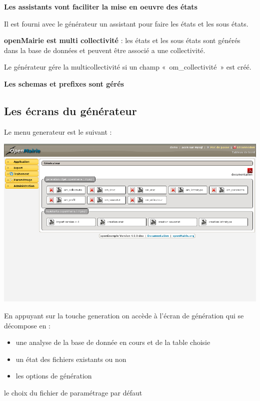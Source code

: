 \documentclass[letterpaper,10pt,french]{manual}
\begin{document}
\textbf{Les assistants vont faciliter la mise en oeuvre des états}

Il est fourni avec le générateur un assistant pour faire les états et les sous états.

\textbf{openMairie est multi collectivité} : les états et les sous états sont générés dans la base de données et peuvent être associé a une collectivité.

Le générateur gére la multicollectivité si un champ « om\_collectivité » est créé.

\textbf{Les schemas et prefixes sont gérés}

\resetcurrentobjects
\hypertarget{--doc-generateur/ecran}{}

\hypertarget{ecran}{}\subsection{Les écrans du générateur}

Le menu generateur est le suivant :

\includegraphics{ecran_1.png}

En appuyant sur la touche generation
on accède à l'écran de génération qui se décompose en :
\begin{itemize}
\item {} 
une analyse  de la base de donnée en cours et de la table choisie

\item {} 
un état des fichiers existants ou non

\item {} 
les options de génération

\end{itemize}

le choix du fichier de paramétrage par défaut
\end{document}
